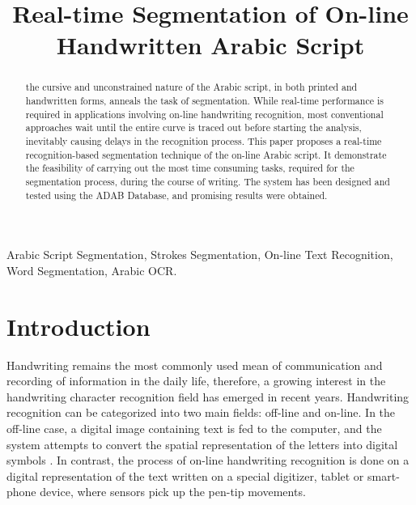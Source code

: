\documentclass[10pt, conference, compsocconf]{IEEEtran}
\begin{document}
\title{Real-time Segmentation of On-line Handwritten Arabic Script}

\author{
\and
{}
}

\maketitle

\begin{abstract}
the cursive and unconstrained nature of the Arabic script, in both printed and handwritten forms, anneals the task of segmentation. 
While real-time performance is required in applications involving on-line handwriting recognition, most conventional approaches wait until the entire curve is traced out before starting the analysis, inevitably causing delays in the recognition process. 
This paper proposes a real-time recognition-based segmentation technique of the on-line Arabic script.
It demonstrate the feasibility of carrying out the most time consuming tasks, required for the segmentation process, during the course of writing. 
The system has been designed and tested using the ADAB Database, and promising results were obtained.\\
\end{abstract}

\begin{IEEEkeywords}
Arabic Script Segmentation, Strokes Segmentation, On-line Text Recognition, Word Segmentation, Arabic OCR.
\end{IEEEkeywords}

\section{Introduction}
Handwriting remains the most commonly used mean of communication and recording of information in the daily life, therefore, a growing interest in the handwriting character recognition field has emerged in recent years. 
Handwriting recognition can be categorized into two main fields: off-line and on-line. 
In the off-line case, a digital image containing text is fed to the computer, and the system attempts to convert the spatial representation of the letters into digital symbols \cite{al2011online}. 
In contrast, the process of on-line handwriting recognition is done on a digital representation of the text written on a special digitizer, tablet or smart-phone device, where sensors pick up the pen-tip movements.
 
\end{document}
